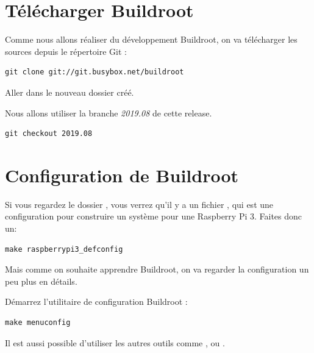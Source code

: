 \section{Télécharger Buildroot}

Comme nous allons réaliser du développement Buildroot, on va télécharger les sources depuis le répertoire Git :

\begin{verbatim}
git clone git://git.busybox.net/buildroot
\end{verbatim}

Aller dans le nouveau dossier  créé.

Nous allons utiliser la branche {\em 2019.08} de cette release.

\begin{verbatim}
git checkout 2019.08
\end{verbatim}

\section{Configuration de Buildroot}

Si vous regardez le dossier , vous verrez qu'il y a un fichier
, qui est une configuration pour construire
un système pour une Raspberry Pi 3. Faites donc un:

\begin{verbatim}
make raspberrypi3_defconfig
\end{verbatim}

Mais comme on souhaite apprendre Buildroot, on va regarder la configuration
un peu plus en détails.

Démarrez l'utilitaire de configuration Buildroot :

\begin{verbatim}
make menuconfig
\end{verbatim}

Il est aussi possible d'utiliser les autres outils comme ,
 ou .

